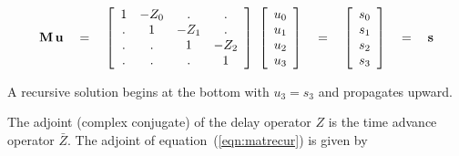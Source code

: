 \begin{equation}
\bold M \, \bold u \eq
\left[
        \begin{array}{cccc}
                1  & -Z_0  & .    &  .    \\
                .  &  1    & -Z_1 &  .    \\
                .  &  .    & 1    & -Z_2  \\
                .  &  .    &  .   &  1
        \end{array}
        \right] \ 
\left[
        \begin{array}{c}
                u_0 \\
                u_1 \\
                u_2 \\
                u_3
        \end{array}
        \right]
\eq
\left[
        \begin{array}{c}
                s_0 \\
                s_1 \\
                s_2 \\
                s_3
        \end{array}
        \right]
\eq \bold s
\label{eqn:matrecur}
\end{equation}

A recursive solution begins at the bottom
with $u_3=s_3$ and propagates upward.

\par
The adjoint (complex conjugate) of the delay operator $Z$
is the time advance operator $\bar Z$.
The adjoint of equation~(\ref{eqn:matrecur})
is given by

